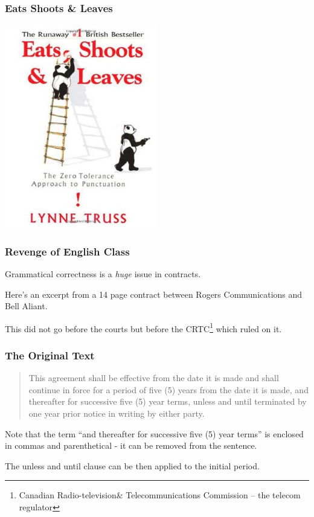 \begin{frame}
\frametitle{Eats Shoots \& Leaves}

\begin{center}
	\includegraphics[width=0.5\textwidth]{images/eatshootsleaves.jpg}
\end{center}

\end{frame}

\begin{frame}
\frametitle{Revenge of English Class}

Grammatical correctness is a \textit{huge} issue in contracts. 

Here's an excerpt from a 14 page contract between Rogers Communications and Bell Aliant.

This did not go before the courts but before the CRTC\footnote{Canadian Radio-television\& Telecommunications Commission -- the telecom regulator} which ruled on it.


\end{frame}



\begin{frame}
\frametitle{The Original Text}

\begin{quote}
This agreement shall be effective from the date it is made and shall continue in force for a period of five (5) years from the date it is made, and thereafter for successive five (5) year terms, unless and until terminated by one year prior notice in writing by either party.
\end{quote}

Note that the term ``and thereafter for successive five (5) year terms'' is enclosed in commas and parenthetical - it can be removed from the sentence.

The unless and until clause can be then applied to the initial period.

\end{frame}



